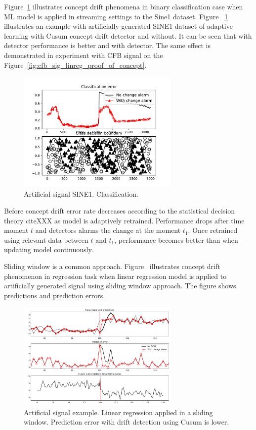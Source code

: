 \documentclass[12 pt]{article}
\begin{document}
  Figure~\ref{fig:sine1_example} illustrates concept drift phenomena in binary classification case when ML model is applied in streaming settings to the Sine1 dataset. 
  Figure ~\ref{fig:sine1_example} illustrates an example with artificially generated SINE1 dataset of adaptive learning with Cusum concept drift detector and without. 
  It can be seen that with detector performance is better and with detector.
  The same effect is demonstrated in experiment with CFB signal on the Figure~\ref{fig:cfb_sig_linreg_proof_of_concept}.
  \begin{figure}[!htb]
    \centering
    \includegraphics[width=0.7\textwidth]{images/proof_of_concept_dt_sine1}
    \caption{Artificial signal SINE1. Classification.}\label{fig:sine1_example}
  \end{figure}
  Before concept drift error rate decreases according to the statistical decision theory cite{XXX} as model is adaptively retrained. 
  Performance drops after time moment $t$ and detectors alarms the change at the moment $t_1$. 
  Once retrained using relevant data between $t$ and $t_1$, performance becomes better than when updating model continuously.

  Sliding window is a common approach.
  Figure~\cite{fig:art_sig_example} illustrates concept drift phenomenon in regression task when linear regression model is applied to artificially generated signal using sliding window approach. 
  The figure shows predictions and prediction errors.
  \begin{figure}[!htb]
    \centering
    \includegraphics[width=0.7\textwidth]{images/proof_of_concept_linreg_art_sig}
    \caption{Artificial signal example. Linear regression applied in a sliding window. Prediction error with drift detection using Cusum is lower.}\label{fig:art_sig_example}
  \end{figure}
\end{document}
